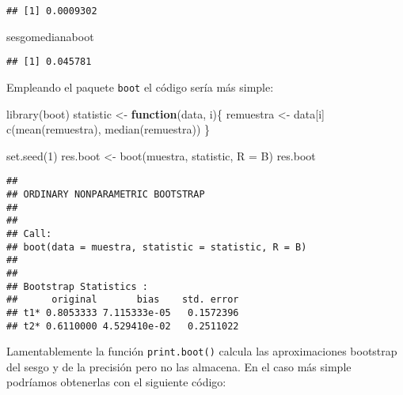 \documentclass[
]{book}
\newenvironment{Shaded}{\begin{snugshade}}{\end{snugshade}}
\newcommand{\AttributeTok}[1]{\textcolor[rgb]{0.77,0.63,0.00}{#1}}
\newcommand{\ControlFlowTok}[1]{\textcolor[rgb]{0.13,0.29,0.53}{\textbf{#1}}}
\newcommand{\DecValTok}[1]{\textcolor[rgb]{0.00,0.00,0.81}{#1}}
\newcommand{\FunctionTok}[1]{\textcolor[rgb]{0.00,0.00,0.00}{#1}}
\newcommand{\NormalTok}[1]{#1}
\newcommand{\OtherTok}[1]{\textcolor[rgb]{0.56,0.35,0.01}{#1}}
\theoremstyle{break}
\theoremstyle{definition}
\theoremstyle{definition}
\theoremstyle{definition}
\theoremstyle{definition}
\theoremstyle{remark}
\begin{document}
\begin{verbatim}
## [1] 0.0009302
\end{verbatim}

\begin{Shaded}
\begin{Highlighting}[]
\NormalTok{sesgomedianaboot}
\end{Highlighting}
\end{Shaded}

\begin{verbatim}
## [1] 0.045781
\end{verbatim}

Empleando el paquete \texttt{boot} el código sería más simple:

\begin{Shaded}
\begin{Highlighting}[]
\FunctionTok{library}\NormalTok{(boot)}
\NormalTok{statistic }\OtherTok{\textless{}{-}} \ControlFlowTok{function}\NormalTok{(data, i)\{}
\NormalTok{  remuestra }\OtherTok{\textless{}{-}}\NormalTok{ data[i]}
  \FunctionTok{c}\NormalTok{(}\FunctionTok{mean}\NormalTok{(remuestra), }\FunctionTok{median}\NormalTok{(remuestra))}
\NormalTok{\}}

\FunctionTok{set.seed}\NormalTok{(}\DecValTok{1}\NormalTok{)}
\NormalTok{res.boot }\OtherTok{\textless{}{-}} \FunctionTok{boot}\NormalTok{(muestra, statistic, }\AttributeTok{R =}\NormalTok{ B)}
\NormalTok{res.boot}
\end{Highlighting}
\end{Shaded}

\begin{verbatim}
## 
## ORDINARY NONPARAMETRIC BOOTSTRAP
## 
## 
## Call:
## boot(data = muestra, statistic = statistic, R = B)
## 
## 
## Bootstrap Statistics :
##      original       bias    std. error
## t1* 0.8053333 7.115333e-05   0.1572396
## t2* 0.6110000 4.529410e-02   0.2511022
\end{verbatim}

Lamentablemente la función \texttt{print.boot()} calcula las aproximaciones
bootstrap del sesgo y de la precisión pero no las almacena.
En el caso más simple podríamos obtenerlas con el siguiente código:
\end{document}
